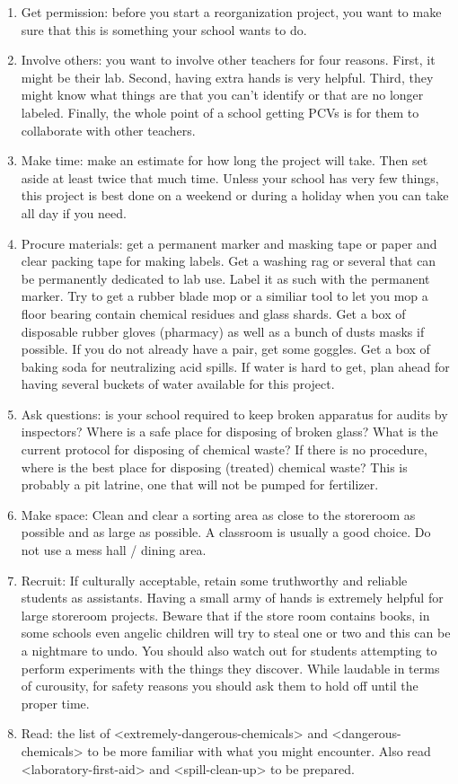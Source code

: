 \begin{enumerate}
\item{Get permission: before you start a reorganization project, you want to make sure that this is something your school wants to do.}
\item{Involve others: you want to involve other teachers for four reasons. First, it might be their lab. Second, having extra hands is very helpful. Third, they might know what things are that you can't identify or that are no longer labeled. Finally, the whole point of a school getting PCVs is for them to collaborate with other teachers.}
\item{Make time: make an estimate for how long the project will take. Then set aside at least twice that much time. Unless your school has very few things, this project is best done on a weekend or during a holiday when you can take all day if you need.}
\item{Procure materials: get a permanent marker and masking tape or paper and clear packing tape for making labels. Get a washing rag or several that can be permanently dedicated to lab use. Label it as such with the permanent marker. Try to get a rubber blade mop or a similiar tool to let you mop a floor bearing contain chemical residues and glass shards. Get a box of disposable rubber gloves (pharmacy) as well as a bunch of dusts masks if possible. If you do not already have a pair, get some goggles. Get a box of baking soda for neutralizing acid spills. If water is hard to get, plan ahead for having several buckets of water available for this project.}
\item{Ask questions: is your school required to keep broken apparatus for audits by inspectors? Where is a safe place for disposing of broken glass? What is the current protocol for disposing of chemical waste? If there is no procedure, where is the best place for disposing (treated) chemical waste? This is probably a pit latrine, one that will not be pumped for fertilizer.}
\item{Make space: Clean and clear a sorting area as close to the storeroom as possible and as large as possible. A classroom is usually a good choice. Do not use a mess hall / dining area.}
\item{Recruit: If culturally acceptable, retain some truthworthy and reliable students as assistants. Having a small army of hands is extremely helpful for large storeroom projects. Beware that if the store room contains books, in some schools even angelic children will try to steal one or two and this can be a nightmare to undo. You should also watch out for students attempting to perform experiments with the things they discover. While laudable in terms of curousity, for safety reasons you should ask them to hold off until the proper time.}
\item{Read: the list of <extremely-dangerous-chemicals> and <dangerous-chemicals> to be more familiar with what you might encounter. Also read <laboratory-first-aid> and <spill-clean-up> to be prepared.}
\end{enumerate}

